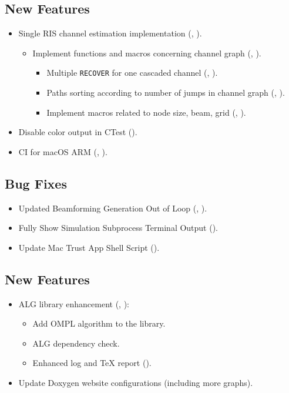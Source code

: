 \subsection*{New Features}
\begin{itemize}
  \item Single RIS channel estimation implementation (, ).
  \begin{itemize}
    \item Implement functions and macros concerning channel graph (, ).
    \begin{itemize}
      \item Multiple \texttt{RECOVER} for one cascaded channel (, ).
      \item Paths sorting according to number of jumps in channel graph (, ).
      \item Implement macros related to node size, beam, grid (, ).
    \end{itemize}
  \end{itemize}
  \item Disable color output in CTest ().
  \item CI for macOS ARM (, ).
\end{itemize}
\subsection*{Bug Fixes}
\begin{itemize}
  \item Updated Beamforming Generation Out of Loop (, ).
  \item Fully Show Simulation Subprocess Terminal Output ().
  \item Update Mac Trust App Shell Script ().
\end{itemize}

\subsection*{New Features}
\begin{itemize}
  \item ALG library enhancement (, ):
  \begin{itemize}
    \item Add OMPL \cite{zhao2023ompl} algorithm to the library.
    \item ALG dependency check.
    \item Enhanced log and \TeX{} report ().
  \end{itemize}
  \item Update Doxygen website configurations (including more graphs).
\end{itemize}
